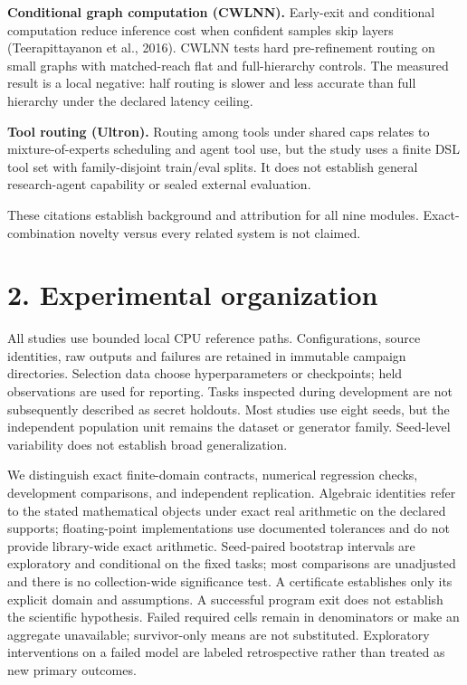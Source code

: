 \documentclass[
  11pt,
  a4paper,
]{article}
\begin{document}
\textbf{Conditional graph computation (CWLNN).} Early-exit and
conditional computation reduce inference cost when confident samples
skip layers (Teerapittayanon et al., 2016). CWLNN tests hard
pre-refinement routing on small graphs with matched-reach flat and
full-hierarchy controls. The measured result is a local negative: half
routing is slower and less accurate than full hierarchy under the
declared latency ceiling.

\textbf{Tool routing (Ultron).} Routing among tools under shared caps
relates to mixture-of-experts scheduling and agent tool use, but the
study uses a finite DSL tool set with family-disjoint train/eval splits.
It does not establish general research-agent capability or sealed
external evaluation.

These citations establish background and attribution for all nine
modules. Exact-combination novelty versus every related system is not
claimed.

\section{2. Experimental organization}\label{experimental-organization}

All studies use bounded local CPU reference paths. Configurations,
source identities, raw outputs and failures are retained in immutable
campaign directories. Selection data choose hyperparameters or
checkpoints; held observations are used for reporting. Tasks inspected
during development are not subsequently described as secret holdouts.
Most studies use eight seeds, but the independent population unit
remains the dataset or generator family. Seed-level variability does not
establish broad generalization.

We distinguish exact finite-domain contracts, numerical regression
checks, development comparisons, and independent replication. Algebraic
identities refer to the stated mathematical objects under exact real
arithmetic on the declared supports; floating-point implementations use
documented tolerances and do not provide library-wide exact arithmetic.
Seed-paired bootstrap intervals are exploratory and conditional on the
fixed tasks; most comparisons are unadjusted and there is no
collection-wide significance test. A certificate establishes only its
explicit domain and assumptions. A successful program exit does not
establish the scientific hypothesis. Failed required cells remain in
denominators or make an aggregate unavailable; survivor-only means are
not substituted. Exploratory interventions on a failed model are labeled
retrospective rather than treated as new primary outcomes.
\end{document}
